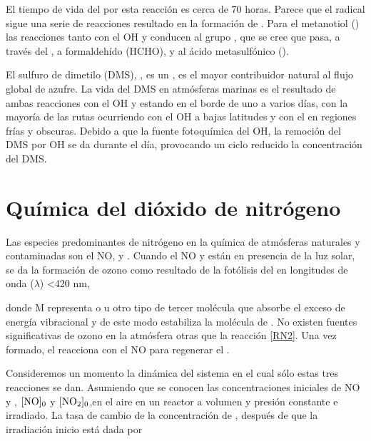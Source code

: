 El tiempo de vida del  por esta reacción es cerca de 70 horas. Parece que el radical  sigue una serie de reacciones resultado en la formación de  . Para el metanotiol () las reacciones tanto con el OH y  conducen al grupo , que se cree que pasa, a través del , a formaldehído (HCHO),   y al ácido metasulfónico ().

El sulfuro de dimetilo (DMS), , es un , es el mayor contribuidor natural al flujo global de azufre. La vida del DMS en atmósferas marinas es el resultado de ambas reacciones con el OH y  estando en el borde de uno a varios días, con la mayoría de las rutas ocurriendo con el OH a bajas latitudes y con el  en regiones frías  y obscuras. Debido a que la fuente fotoquímica del OH, la remoción del DMS por OH se da durante el día, provocando un ciclo reducido la concentración del DMS.


\section{Química del dióxido de nitrógeno}
Las especies predominantes de nitrógeno en la química de atmósferas naturales y contaminadas son el NO,  y . 
Cuando el NO y   están en presencia de la luz solar, se da la formación de ozono como resultado de la fotólisis del   en longitudes de onda ($\lambda$) <420 nm,



donde M representa  o  u otro tipo de tercer molécula que absorbe el exceso de energía vibracional y de este modo estabiliza la molécula de . No existen fuentes significativas de ozono en la atmósfera otras que la reacción \ref{RN2}. Una vez formado, el  reacciona con el NO para regenerar el .


Consideremos un momento la dinámica del sistema en el cual sólo estas tres reacciones se dan. Asumiendo que se conocen las concentraciones iniciales de NO y , $[\ce{NO}]_0$ y $[\ce{NO2}]_0$,en el aire en un reactor a volumen y presión constante e irradiado. La tasa de cambio de la concentración de , después de que la irradiación inicio está dada por

